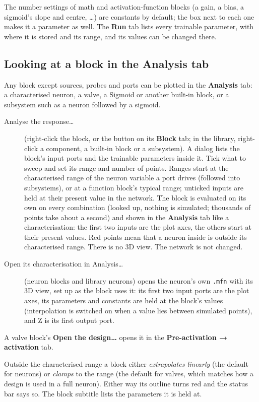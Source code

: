 \documentclass[11pt,a4paper]{article}
\newcommand{\code}[1]{\texttt{#1}}
\newcommand{\menu}[1]{\textsf{\textbf{#1}}}
\begin{document}
The number settings of math and activation-function blocks (a gain, a bias, a sigmoid's slope and centre, \ldots) are
constants by default; the box next to each one makes it a parameter as well. The \menu{Run} tab lists every
trainable parameter, with where it is stored and its range, and its values can be changed there.

\subsection*{Looking at a block in the Analysis tab}
Any block except sources, probes and ports can be plotted in the \menu{Analysis} tab: a characterised neuron, a valve,
a Sigmoid or another built-in block, or a subsystem such as a neuron followed by a sigmoid.
\begin{description}
\item[Analyse the response…] (right-click the block, or the button on its \menu{Block} tab; in the library,
  right-click a component, a built-in block or a subsystem). A dialog lists the block's input ports and the trainable
  parameters inside it. Tick what to sweep and set its range and number of points. Ranges start at the characterised
  range of the neuron variable a port drives (followed into subsystems), or at a function block's typical range;
  unticked inputs are held at their present value in the network. The block is evaluated on its own on every
  combination (looked up, nothing is simulated; thousands of points take about a second) and shown in the
  \menu{Analysis} tab like a characterisation: the first two inputs are the plot axes, the others start at their
  present values. Red points mean that a neuron inside is outside its characterised range. There is no 3D view.
  The network is not changed.
\item[Open its characterisation in Analysis…] (neuron blocks and library neurons) opens the neuron's own
  \code{.mfn} with its 3D view, set up as the block uses it: its first two input ports are the plot axes, its
  parameters and constants are held at the block's values (interpolation is switched on when a value lies between
  simulated points), and Z is its first output port.
\end{description}
A valve block's \menu{Open the design…} opens it in the \menu{Pre-activation → activation} tab.

Outside the characterised range a block either \emph{extrapolates linearly} (the default for neurons) or
\emph{clamps} to the range (the default for valves, which matches how a design is used in a full neuron). Either way its
outline turns red and the status bar says so. The block subtitle lists the parameters it is held at.
\end{document}
